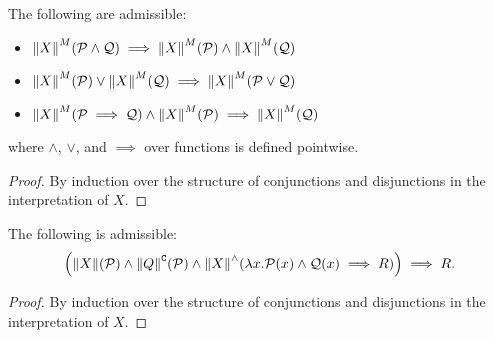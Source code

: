 \begin{lemma}
  \label{algorithmic:interpretation-connectives}
  The following are admissible:
  \begin{itemize}
    \item $\interpG X M {\mathcal P \wedge \mathcal Q} \implies \interpG X M {\mathcal P} \wedge \interpG X M {\mathcal Q}$
    \item $\interpG X M {\mathcal P} \vee \interpG X M {\mathcal Q} \implies \interpG X M {\mathcal P \vee \mathcal Q}$
    \item $\interpG X M {\mathcal P \implies \mathcal Q} \wedge \interpG X M {\mathcal P} \implies \interpG X M {\mathcal Q}$
  \end{itemize}
  where $\wedge$, $\vee$, and $\implies$ over functions is defined pointwise.
\end{lemma}
\begin{proof}
  By induction over the structure of conjunctions and disjunctions in the interpretation of $X$.
\end{proof}


\begin{lemma}
  \label{algorithmic:interpretation-mix}
  The following is admissible:
  $$ \parens*{\interpJ X \wedge \interpCJ Q \wedge
     \interpWedge X {\lam x {\mathcal P {(x)} \wedge \mathcal Q {(x)} \implies R }} }
     \implies R.$$
\end{lemma}
\begin{proof}
  By induction over the structure of conjunctions and disjunctions in the interpretation of $X$.
\end{proof}

